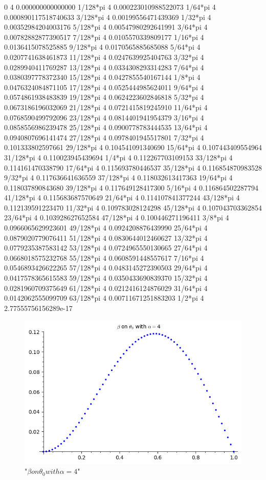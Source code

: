 \documentclass[11pt]{article}
\begin{document}
0 4 0.000000000000000
1/128*pi 4 0.000223010988522073
1/64*pi 4 0.000890117518740633
3/128*pi 4 0.00199556471439369
1/32*pi 4 0.00352984204003176
5/128*pi 4 0.00547980292641991
3/64*pi 4 0.00782882877390517
7/128*pi 4 0.0105570339809177
1/16*pi 4 0.0136415078525885
9/128*pi 4 0.0170565885685088
5/64*pi 4 0.0207741638461873
11/128*pi 4 0.0247639925404763
3/32*pi 4 0.0289940411769287
13/128*pi 4 0.0334308293314283
7/64*pi 4 0.0380397778372340
15/128*pi 4 0.0427855540167144
1/8*pi 4 0.0476324084871105
17/128*pi 4 0.0525444985624011
9/64*pi 4 0.0574861938483839
19/128*pi 4 0.0624223602846818
5/32*pi 4 0.0673186196032069
21/128*pi 4 0.0721415819245910
11/64*pi 4 0.0768590499792096
23/128*pi 4 0.0814401941954379
3/16*pi 4 0.0858556986239478
25/128*pi 4 0.0900778783444535
13/64*pi 4 0.0940807696141474
27/128*pi 4 0.0978401945517801
7/32*pi 4 0.101333802597661
29/128*pi 4 0.104541091340690
15/64*pi 4 0.107443409554964
31/128*pi 4 0.110023945439694
1/4*pi 4 0.112267703109153
33/128*pi 4 0.114161470338790
17/64*pi 4 0.115693780446537
35/128*pi 4 0.116854870983528
9/32*pi 4 0.117636641636559
37/128*pi 4 0.118032613417363
19/64*pi 4 0.118037890843680
39/128*pi 4 0.117649128417300
5/16*pi 4 0.116864502287794
41/128*pi 4 0.115683687570649
21/64*pi 4 0.114107841377244
43/128*pi 4 0.112139591223470
11/32*pi 4 0.109783028124298
45/128*pi 4 0.107043703362854
23/64*pi 4 0.103928627652584
47/128*pi 4 0.100446271196411
3/8*pi 4 0.0966065629923601
49/128*pi 4 0.0924208876439990
25/64*pi 4 0.0879020779076411
51/128*pi 4 0.0830644012460627
13/32*pi 4 0.0779235387583142
53/128*pi 4 0.0724965550130665
27/64*pi 4 0.0668018575232768
55/128*pi 4 0.0608591448557617
7/16*pi 4 0.0546893426622265
57/128*pi 4 0.0483145272390503
29/64*pi 4 0.0417578365615583
59/128*pi 4 0.0350433690839370
15/32*pi 4 0.0281960709375649
61/128*pi 4 0.0212416124876029
31/64*pi 4 0.0142062555099709
63/128*pi 4 0.00711671251883203
1/2*pi 4 2.77555756156289e-17


\begin{figure}
\centering
\includegraphics{output_39_1.png}
\caption{"$\beta on \theta_0 with \alpha = 4 $" }
\end{figure}
    
\end{document}
